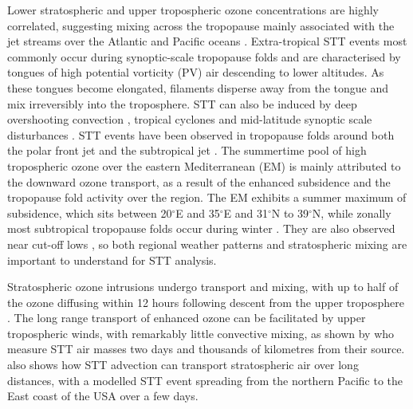   Lower stratospheric and upper tropospheric ozone concentrations are highly correlated, suggesting mixing across the tropopause mainly associated with the jet streams over the Atlantic and Pacific oceans \citep{Terao2008}.
  Extra-tropical STT events most commonly occur during synoptic-scale tropopause folds \citep{Sprenger2003, Tang2012, Frey2015} and are characterised by tongues of high potential vorticity (PV) air descending to lower altitudes.
  As these tongues become elongated, filaments disperse away from the tongue and mix irreversibly into the troposphere.
  STT can also be induced by deep overshooting convection \citep{Frey2015}, tropical cyclones \citep{Das2016} and mid-latitude synoptic scale disturbances \citep[e.g.][]{Stohl2003, Mihalikova2012}. 
  STT events have been observed in tropopause folds around both the polar front jet \citep{Vaughan1994, Beekmann1997} and the subtropical jet \citep{Baray2000}.
  The summertime pool of high tropospheric ozone over the eastern Mediterranean (EM) is mainly attributed to the downward ozone transport, as a result of the enhanced subsidence \citep{Zanis2014} and the tropopause fold activity \citep{Akritidis2016} over the region.
  The EM exhibits a summer maximum of subsidence, which sits between 20$^{\circ}$E and 35$^{\circ}$E and 31$^{\circ}$N to 39$^{\circ}$N, while zonally most subtropical tropopause folds occur during winter \citep[][and references therein]{Tyrlis2014}.
  They are also observed near cut-off lows \citep{Price1993, Wirth1995}, so both regional weather patterns and stratospheric mixing are important to understand for STT analysis.
  
  Stratospheric ozone intrusions undergo transport and mixing, with up to half of the ozone diffusing within 12 hours following descent from the upper troposphere \citep{Trickl2014}.
  The long range transport of enhanced ozone can be facilitated by upper tropospheric winds, with remarkably little convective mixing, as shown by \cite{Trickl2014} who measure STT air masses two days and thousands of kilometres from their source.
  \citet{Cooper2004} also shows how STT advection can transport stratospheric air over long distances, with a modelled STT event spreading from the northern Pacific to the East coast of the USA over a few days.
  
